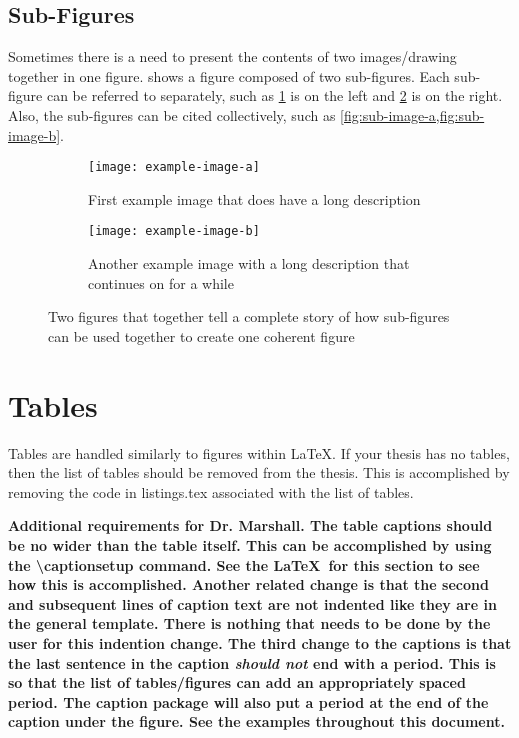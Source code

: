 \subsection{Sub-Figures}
    Sometimes there is a need to present the contents of two images/drawing together in one figure.
     shows a figure composed of two sub-figures.
    Each sub-figure can be referred to separately, such as \cref{fig:sub-image-a} is on the left and \cref{fig:sub-image-b} is on the right.
    Also, the sub-figures can be cited collectively, such as \cref{fig:sub-image-a,fig:sub-image-b}.
    \begin{figure}
        \centering
        \begin{subfigure}[t]{2.5in}
            \texttt{[image: example-image-a]}
            \caption{First example image that does have a long description}
            \label{fig:sub-image-a}
        \end{subfigure}
        \hspace{0.2in}
        \begin{subfigure}[t]{2.5in}
            \texttt{[image: example-image-b]}
            \caption[size=normal]{Another example image with a long description that continues on for a while}
            \label{fig:sub-image-b}
        \end{subfigure}
        \captionsetup{width=5.25in}
        \caption{Two figures that together tell a complete story of how sub-figures can be used together to create one coherent figure}
        \label{fig:subfig-example}
    \end{figure}

\section{Tables} \label{sec:Tables}
    Tables are handled similarly to figures within \LaTeX.
    If your thesis has no tables, then the list of tables should be removed from the thesis.
    This is accomplished by removing the code in listings.tex associated with the list of tables.

    \textbf{
    Additional requirements for Dr. Marshall.
    The table captions should be no wider than the table itself.
    This can be accomplished by using the \textbackslash captionsetup command.
    See the \LaTeX\ for this section to see how this is accomplished.
    Another related change is that the second and subsequent lines of caption text are not indented like they are in the general template.
    There is nothing that needs to be done by the user for this indention change.
    The third change to the captions is that the last sentence in the caption \emph{should not} end with a period.
    This is so that the list of tables/figures can add an appropriately spaced period.
    The caption package will also put a period at the end of the caption under the figure.
    See the examples throughout this document.
    }

